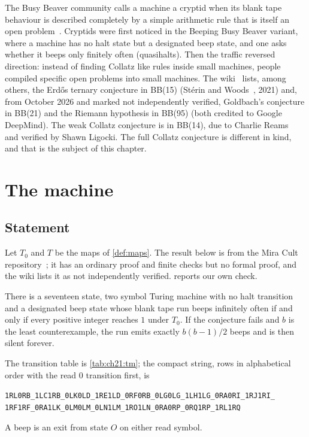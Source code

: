 The Busy Beaver community calls a machine a cryptid when its blank tape behaviour is described completely by a simple arithmetic rule that is itself an open problem~\cite{bbchallengecryptids}. Cryptids were first noticed in the Beeping Busy Beaver variant, where a machine has no halt state but a designated beep state, and one asks whether it beeps only finitely often (quasihalts). Then the traffic reversed direction: instead of finding Collatz like rules inside small machines, people compiled specific open problems into small machines. The wiki~\cite{bbchallengecryptids} lists, among others, the Erd\H{o}s ternary conjecture in BB(15) (St\'erin and Woods~\cite{sterin2021}, 2021) and, from October 2026 and marked not independently verified, Goldbach's conjecture in BB(21) and the Riemann hypothesis in BB(95) (both credited to Google DeepMind). The weak Collatz conjecture is in BB(14), due to Charlie Reams~\cite{reams2026} and verified by Shawn Ligocki. The full Collatz conjecture is different in kind, and that is the subject of this chapter.

\section{The machine}\label{sec:ch21:machine}

\subsection{Statement}

Let $T_0$ and $T$ be the maps of \cref{def:maps}. The result below is from the Mira Cult repository~\cite{mira2026}; it has an ordinary proof and finite checks but no formal proof, and the wiki lists it as not independently verified.  reports our own check.

\begin{theorem}[Mira, 2026]\label{thm:ch21:mira}
There is a seventeen state, two symbol Turing machine with no halt transition and a designated beep state whose blank tape run beeps infinitely often if and only if every positive integer reaches $1$ under $T_0$. If the conjecture fails and $b$ is the least counterexample, the run emits exactly $b(b-1)/2$ beeps and is then silent forever.
\end{theorem}

The transition table is \cref{tab:ch21:tm}; the compact string, rows in alphabetical order with the read $0$ transition first, is
\begin{center}\footnotesize
\texttt{1RL0RB\_1LC1RB\_0LK0LD\_1RE1LD\_0RF0RB\_0LG0LG\_1LH1LG\_0RA0RI\_1RJ1RI\_}\\
\texttt{1RF1RF\_0RA1LK\_0LM0LM\_0LN1LM\_1RO1LN\_0RA0RP\_0RQ1RP\_1RL1RQ}
\end{center}
A beep is an exit from state $O$ on either read symbol.

